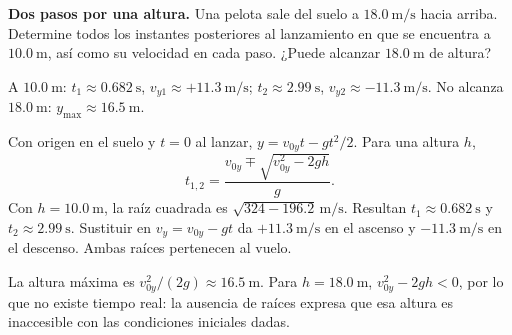 \begin{ejercicio}
\textbf{Dos pasos por una altura.} Una pelota sale del suelo a \(\SI{18.0}{\meter\per\second}\) hacia arriba. Determine todos los instantes posteriores al lanzamiento en que se encuentra a \(\SI{10.0}{\meter}\), así como su velocidad en cada paso. ¿Puede alcanzar \(\SI{18.0}{\meter}\) de altura?
\end{ejercicio}
\begin{respuesta}
A \(\SI{10.0}{\meter}\): \(t_1\approx\SI{0.682}{\second}\), \(v_{y1}\approx+\SI{11.3}{\meter\per\second}\); \(t_2\approx\SI{2.99}{\second}\), \(v_{y2}\approx-\SI{11.3}{\meter\per\second}\). No alcanza \(\SI{18.0}{\meter}\): \(y_{\max}\approx\SI{16.5}{\meter}\).
\end{respuesta}
\begin{explicacion}
Con origen en el suelo y \(t=0\) al lanzar, \(y=v_{0y}t-gt^2/2\). Para una altura \(h\),
\[ t_{1,2}=\frac{v_{0y}\mp\sqrt{v_{0y}^2-2gh}}{g}. \]
Con \(h=\SI{10.0}{\meter}\), la raíz cuadrada es \(\sqrt{324-196.2}\,\si{\meter\per\second}\). Resultan \(t_1\approx\SI{0.682}{\second}\) y \(t_2\approx\SI{2.99}{\second}\). Sustituir en \(v_y=v_{0y}-gt\) da \(+\SI{11.3}{\meter\per\second}\) en el ascenso y \(-\SI{11.3}{\meter\per\second}\) en el descenso. Ambas raíces pertenecen al vuelo.

La altura máxima es \(v_{0y}^2/(2g)\approx\SI{16.5}{\meter}\). Para \(h=\SI{18.0}{\meter}\), \(v_{0y}^2-2gh<0\), por lo que no existe tiempo real: la ausencia de raíces expresa que esa altura es inaccesible con las condiciones iniciales dadas.
\end{explicacion}

